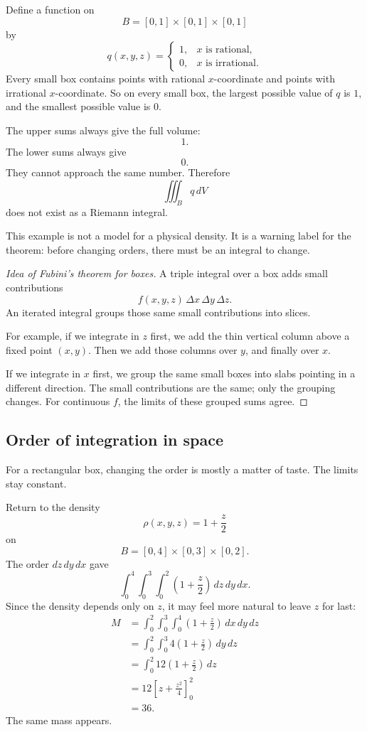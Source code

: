 \begin{example}
Define a function on
\[
    B=[0,1]\times[0,1]\times[0,1]
\]
by
\[
    q(x,y,z)=
    \begin{cases}
    1, & x\text{ is rational},\\
    0, & x\text{ is irrational}.
    \end{cases}
\]
Every small box contains points with rational \(x\)-coordinate and points with irrational
\(x\)-coordinate.  So on every small box, the largest possible value of \(q\) is \(1\), and
the smallest possible value is \(0\).

The upper sums always give the full volume:
\[
    1.
\]
The lower sums always give
\[
    0.
\]
They cannot approach the same number.  Therefore
\[
    \iiint_B q\,dV
\]
does not exist as a Riemann integral.

This example is not a model for a physical density.  It is a warning label for the
theorem: before changing orders, there must be an integral to change.
\end{example}

\begin{proof}[Idea of Fubini's theorem for boxes]
A triple integral over a box adds small contributions
\[
    f(x,y,z)\,\Delta x\,\Delta y\,\Delta z.
\]
An iterated integral groups those same small contributions into slices.

For example, if we integrate in \(z\) first, we add the thin vertical column above a fixed
point \((x,y)\).  Then we add those columns over \(y\), and finally over \(x\).

If we integrate in \(x\) first, we group the same small boxes into slabs pointing in a
different direction.  The small contributions are the same; only the grouping changes.
For continuous \(f\), the limits of these grouped sums agree.
\end{proof}

\subsection{Order of integration in space}

For a rectangular box, changing the order is mostly a matter of taste.  The limits stay
constant.

Return to the density
\[
    \rho(x,y,z)=1+\frac z2
\]
on
\[
    B=[0,4]\times[0,3]\times[0,2].
\]
The order \(dz\,dy\,dx\) gave
\[
    \int_0^4\int_0^3\int_0^2
    \left(1+\frac z2\right)\,dz\,dy\,dx.
\]
Since the density depends only on \(z\), it may feel more natural to leave \(z\) for last:
\[
\begin{aligned}
M
&=
\int_0^2\int_0^3\int_0^4
\left(1+\frac z2\right)\,dx\,dy\,dz\\
&=
\int_0^2\int_0^3
4\left(1+\frac z2\right)\,dy\,dz\\
&=
\int_0^2
12\left(1+\frac z2\right)\,dz\\
&=
12\left[z+\frac{z^2}{4}\right]_0^2\\
&=
36.
\end{aligned}
\]
The same mass appears.

